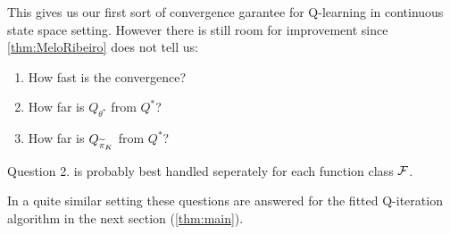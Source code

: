 This gives us our first sort of convergence garantee for Q-learning in
continuous state space setting.
However there is still room for improvement since \cref{thm:MeloRibeiro}
does not tell us:
\begin{enumerate}
  \item How fast is the convergence?
  \item How far is $Q_{\theta^*}$ from $Q^*$?
    \label{item:linApprox1}
  \item How far is $Q_{\widetilde{\pi}_K}$ from $Q^*$?
\end{enumerate}
\begin{rem}
  Question 2. is probably best handled seperately for each
    function class $\mathcal{F}$.
\end{rem}
In a quite similar setting these questions are answered for the
fitted Q-iteration algorithm in the next section (\cref{thm:main}).


